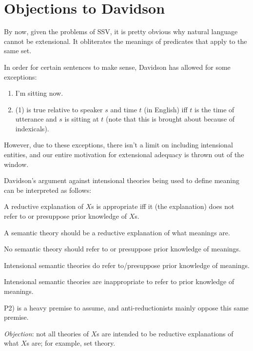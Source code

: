 \section{Objections to Davidson}

\begin{objection}
By now, given the problems of SSV, it is pretty obvious why natural language cannot be extensional. It obliterates the meanings of predicates that apply to the same set.
\end{objection}

\begin{objection}
In order for certain sentences to make sense, Davidson has allowed for some exceptions:
\begin{enumerate}
  \item I'm sitting now.
  \item (1) is true relative to speaker $s$ and time $t$ (in English) iff $t$ is the time of utterance and $s$ is sitting at $t$ (note that this is brought about because of indexicals).
\end{enumerate}
However, due to these exceptions, there isn't a limit on including intensional entities, and our entire motivation for extensional adequacy is thrown out of the window.
\end{objection}

\begin{objection}
Davidson's argument against intensional theories being used to define meaning can be interpreted as follows:
\begin{premises}
  \item[P1)] A reductive explanation of $X$s is appropriate iff it (the explanation) does not refer to or presuppose prior knowledge of $X$s.
  \item[P2)] A semantic theory should be a reductive explanation of what meanings are.
  \item[C1)] No semantic theory should refer to or presuppose prior knowledge of meanings.
  \item[P3)] Intensional semantic theories do refer to/presuppose prior knowledge of meanings.
  \item[C2)] Intensional semantic theories are inappropriate to refer to prior knowledge of meanings.
\end{premises}
P2) is a heavy premise to assume, and anti-reductionists mainly oppose this same premise.

\emph{Objection}: not all theories of $X$s are intended to be reductive explanations of what $X$s are; for example, set theory.
\end{objection}
